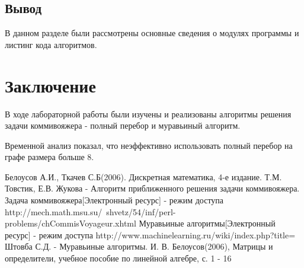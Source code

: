 \documentclass[12pt]{report}
\begin{document}
\section*{Вывод}
В данном разделе были рассмотрены основные сведения о модулях программы и листинг кода алгоритмов.


\chapter*{Заключение}
В ходе лабораторной работы были изучены и реализованы алгоритмы решения задачи коммивояжера - полный перебор и муравьиный алгоритм.

Временной анализ показал, что неэффективно использовать полный перебор на графе размера больше 8.

\begin{thebibliography}{3}
	 Белоусов А.И., Ткачев С.Б(2006). Дискретная математика, 4-е издание.
	 Т.М. Товстик, Е.В. Жукова - Алгоритм приближенного решения задачи коммивояжера.
	 Задача коммивояжера[Электронный ресурс] - режим доступа http://mech.math.msu.su/~shvetz/54/inf/perl-problems/chCommisVoyageur.xhtml
	 Муравьиные алгоритмы[Электронный ресурс] - режим доступа http://www.machinelearning.ru/wiki/index.php?title=%
	 Штовба С.Д. - Муравьиные алгоритмы.
	 И. В. Белоусов(2006), Матрицы и определители, учебное пособие по линейной алгебре, с. 1 - 16
\end{thebibliography}
\end{document}
